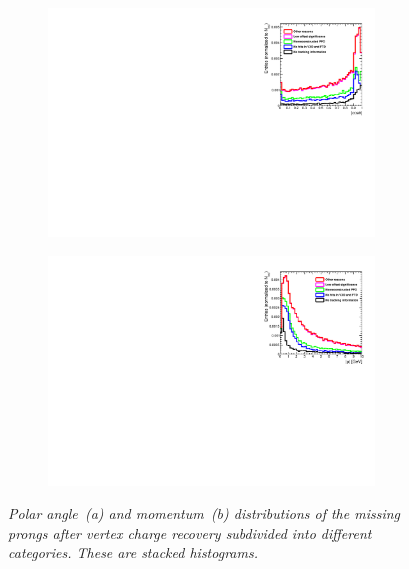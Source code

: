\begin{figure}
\centering
\begin{subfigure}{0.5\textwidth}
    \includegraphics[width=0.95\textwidth]{ILD/plots/recovery-missed-cos.pdf}
\caption{\label{fig:RecoveryMissingTracks_cos_3} }
\end{subfigure}%
  \begin{subfigure}{0.5\textwidth}
\centering
    \includegraphics[width=0.95\textwidth]{ILD/plots/recovery-missed-p.pdf}
\caption{\label{fig:RecoveryMissingTracks_p_3} }
\end{subfigure}
    \caption{\sl Polar angle~(a) and momentum~(b) distributions of the missing prongs after vertex charge recovery subdivided into different categories. These are stacked histograms. }
    \label{fig:RecoveryMissingTracks_3}
\end{figure}

